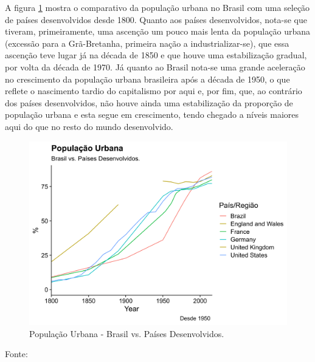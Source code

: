 \documentclass[
	12pt,				%
	oneside,			%
	a4paper,			%
	chapter=TITLE,		%
	section=TITLE,		%
	english,			%
	brazil				%
	]{abntex2}
\newcommand{\bcenter}{\begin{center}}
\newcommand{\ecenter}{\end{center}}
\begin{document}
A figura \ref{fig:pop-urb-brazil-developed} mostra o comparativo da
população urbana no Brasil com uma seleção de países desenvolvidos desde
1800. Quanto aos países desenvolvidos, nota-se que tiveram,
primeiramente, uma ascenção um pouco mais lenta da população urbana
(excessão para a Grã-Bretanha, primeira nação a industrializar-se), que
essa ascenção teve lugar já na década de 1850 e que houve uma
estabilização gradual, por volta da década de 1970. Já quanto ao Brasil
nota-se uma grande aceleração no crescimento da população urbana
brasileira após a década de 1950, o que reflete o nascimento tardio do
capitalismo por aqui e, por fim, que, ao contrário dos países
desenvolvidos, não houve ainda uma estabilização da proporção de
população urbana e esta segue em crescimento, tendo chegado a níveis
maiores aqui do que no resto do mundo desenvolvido.
\begin{figure}[H]

{\centering \includegraphics[width=0.8\linewidth]{images/pop-urb-brazil-developed-1} 

}

\caption{População Urbana - Brasil vs. Países Desenvolvidos.}\label{fig:pop-urb-brazil-developed}
\end{figure}
\bcenter
Fonte: \textcite{doi:10.1177/0959683609356587} \ecenter
\end{document}
